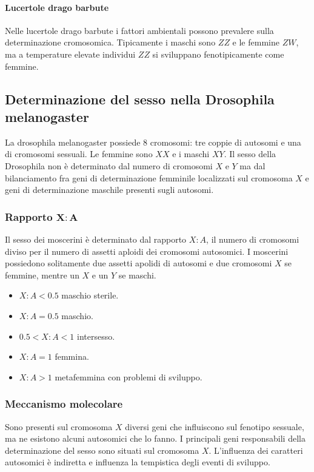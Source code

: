 			\paragraph{Lucertole drago barbute}
			Nelle lucertole drago barbute i fattori ambientali possono prevalere sulla determinazione cromosomica.
			Tipicamente i maschi sono $ZZ$ e le femmine $ZW$, ma a temperature elevate individui $ZZ$ si sviluppano fenotipicamente come femmine.

	\subsection{Determinazione del sesso nella Drosophila melanogaster}
	La drosophila melanogaster possiede $8$ cromosomi: tre coppie di autosomi e una di cromosomi sessuali.
	Le femmine sono $XX$ e i maschi $XY$.
	Il sesso della Drosophila non \`e determinato dal numero di cromosomi $X$ e $Y$ ma dal bilanciamento fra geni di determinazione femminile localizzati sul cromosoma $X$ e geni di determinazione maschile presenti sugli autosomi.
	
		\subsubsection{Rapporto $\mathbf{X:A}$}
		Il sesso dei moscerini \`e determinato dal rapporto $X:A$, il numero di cromosomi diviso per il numero di assetti aploidi dei cromosomi autosomici.
		I moscerini possiedono solitamente due assetti apolidi di autosomi e due cromosomi $X$ se femmine, mentre un $X$ e un $Y$ se maschi.
		\begin{multicols}{2}
			\begin{itemize}
				\item $X:A < 0.5$ maschio sterile.
				\item $X:A=0.5$ maschio.
				\item $0.5<X:A<1$ intersesso.
				\item $X:A = 1$ femmina.
				\item $X:A>1$ metafemmina con problemi di sviluppo.
			\end{itemize}
		\end{multicols}
	
		\subsubsection{Meccanismo molecolare}
		Sono presenti sul cromosoma $X$ diversi geni che influiscono sul fenotipo sessuale, ma ne esistono alcuni autosomici che lo fanno.
		I principali geni responsabili della determinazione del sesso sono situati sul cromosoma $X$.
		L'influenza dei caratteri autosomici \`e indiretta e influenza la tempistica degli eventi di sviluppo.

